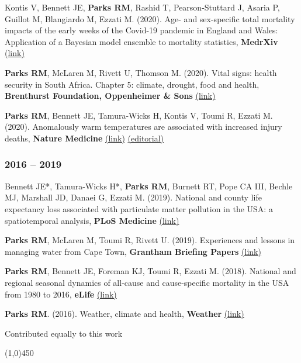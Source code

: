 \noindent Kontis V, Bennett JE, \textbf{Parks RM}, Rashid T, Pearson-Stuttard J, Asaria P, Guillot M, Blangiardo M, Ezzati M. (2020). Age- and sex-specific total mortality impacts of the early weeks of the Covid-19 pandemic in England and Wales: Application of a Bayesian model ensemble to mortality statistics, \textbf{MedrXiv} \href{https://www.medrxiv.org/content/10.1101/2020.05.20.20107680v1}{(link)} \bigskip

\noindent \textbf{Parks RM}, McLaren M, Rivett U, Thomson M. (2020). Vital signs: health security in South Africa. Chapter 5: climate, drought, food and health, \textbf{Brenthurst Foundation, Oppenheimer \& Sons} \href{http://www.thebrenthurstfoundation.org/article/vital-signs-health-security-in-south-africa/}{(link)} \bigskip

\noindent \textbf{Parks RM}, Bennett JE, Tamura-Wicks H, Kontis V, Toumi R, Ezzati M. (2020). Anomalously warm temperatures are associated with increased injury deaths, \textbf{Nature Medicine} \href{https://www.nature.com/articles/s41591-019-0721-y}{(link)} \href{https://www.nature.com/articles/s41591-019-0728-4}{(editorial)}


% 


\subsubsection*{2016 -- 2019}

\noindent Bennett JE*, Tamura-Wicks H*, \textbf{Parks RM}, Burnett RT, Pope CA III, Bechle MJ, Marshall JD, Danaei G, Ezzati M. (2019). National and county life expectancy loss associated with particulate matter pollution in the USA: a spatiotemporal analysis, \textbf{PLoS Medicine} \href{https://doi.org/10.1371/journal.pmed.1002856}{(link)} \bigskip

\noindent \textbf{Parks RM}, McLaren M, Toumi R, Rivett U. (2019). Experiences and lessons in managing water from Cape Town, \textbf{Grantham Briefing Papers} \href{https://bit.ly/2Uu9oAh}{(link)} \bigskip

\noindent \textbf{Parks RM}, Bennett JE, Foreman KJ, Toumi R, Ezzati M. (2018). National and regional seasonal dynamics of all-cause and cause-specific mortality in the USA from 1980 to 2016, \textbf{eLife}  \href{https://doi.org/10.7554/eLife.35500}{(link)} \bigskip

\noindent \textbf{Parks RM}. (2016). Weather, climate and health, \textbf{Weather} \href{https://doi.org/10.1002/wea.2752}{(link)} \bigskip

\noindent * Contributed equally to this work

\begin{center} \line(1,0){450} \end{center}
